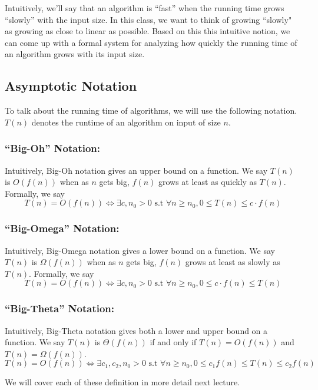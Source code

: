 \documentclass [12pt]{article}
\begin{document}
Intuitively, we’ll say that an algorithm is ``fast'' when the running time grows ``slowly'' with the input size. In this class, we want to think of growing “slowly" as growing as close to linear as possible. Based on this this intuitive notion, we can come up with a formal system for analyzing how quickly the running time of an algorithm grows with its input size.

\subsection{Asymptotic Notation}
To talk about the running time of algorithms, we will use the following notation. $T(n)$ denotes
the runtime of an algorithm on input of size $n$.

\subsubsection{``Big-Oh'' Notation:}

Intuitively, Big-Oh notation gives an upper bound on a function. We say $T(n)$ is $O(f(n))$ when as $n$ gets big, $f (n)$ grows at least as quickly as $T(n)$. Formally, we say
$$
 T(n) = O(f(n)) \iff \exists c, n_0 > 0 \text{ s.t } \forall n \geq n_0, 0 \leq T(n) \leq c \cdot f(n)
$$

\subsubsection{``Big-Omega'' Notation:}

Intuitively, Big-Omega notation gives a lower bound on a function. We say $T(n)$ is $\Omega(f(n))$ when as $n$ gets big, $f (n)$ grows at least as slowly as $T(n)$. Formally, we say
$$
 T(n) = O(f(n)) \iff \exists c, n_0 > 0 \text{ s.t } \forall n \geq n_0, 0 \leq c \cdot f(n) \leq T(n)
$$

\subsubsection{``Big-Theta'' Notation:}

Intuitively, Big-Theta notation gives both a lower and upper bound on a function. We say $T(n)$ is $\Theta(f(n))$ if and only if $T(n) = O(f(n))$ and $T(n) = \Omega(f(n))$.
$$
 T(n) = O(f(n)) \iff \exists c_1, c_2, n_0 > 0 \text{ s.t } \forall n \geq n_0, 0 \leq c_1 f(n) \leq T(n) \leq c_2 f(n)
$$

We will cover each of these definition in more detail next lecture.
\end{document}
